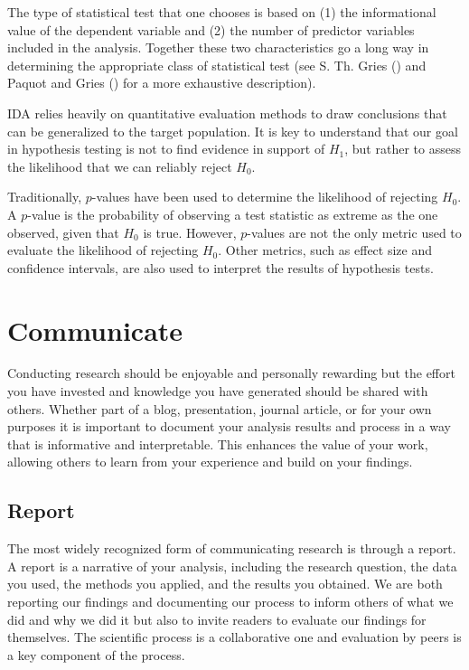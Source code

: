 \documentclass[
  letterpaper,
]{latex/krantz}
\theoremstyle{definition}
\theoremstyle{remark}
\begin{document}
The type of statistical test that one chooses is based on (1) the
informational value of the dependent variable and (2) the number of
predictor variables included in the analysis. Together these two
characteristics go a long way in determining the appropriate class of
statistical test (see S. Th. Gries () and
Paquot and Gries () for a more
exhaustive description).

IDA relies heavily on quantitative evaluation methods to draw
conclusions that can be generalized to the target population. It is key
to understand that our goal in hypothesis testing is not to find
evidence in support of \(H_1\), but rather to assess the likelihood that
we can reliably reject \(H_0\).

Traditionally, \(p\)-values have been used to determine the likelihood
of rejecting \(H_0\). A \(p\)-value is the probability of observing a
test statistic as extreme as the one observed, given that \(H_0\) is
true. However, \(p\)-values are not the only metric used to evaluate the
likelihood of rejecting \(H_0\). Other metrics, such as effect size and
confidence intervals, are also used to interpret the results of
hypothesis tests.

\section{Communicate}\label{sec-aa-communicate}

Conducting research should be enjoyable and personally rewarding but the
effort you have invested and knowledge you have generated should be
shared with others. Whether part of a blog, presentation, journal
article, or for your own purposes it is important to document your
analysis results and process in a way that is informative and
interpretable. This enhances the value of your work, allowing others to
learn from your experience and build on your findings.

\subsection{Report}\label{sec-aa-report}

The most widely recognized form of communicating research is through a
report. A report is a narrative of your analysis, including the research
question, the data you used, the methods you applied, and the results
you obtained. We are both reporting our findings and documenting our
process to inform others of what we did and why we did it but also to
invite readers to evaluate our findings for themselves. The scientific
process is a collaborative one and evaluation by peers is a key
component of the process.
\end{document}
